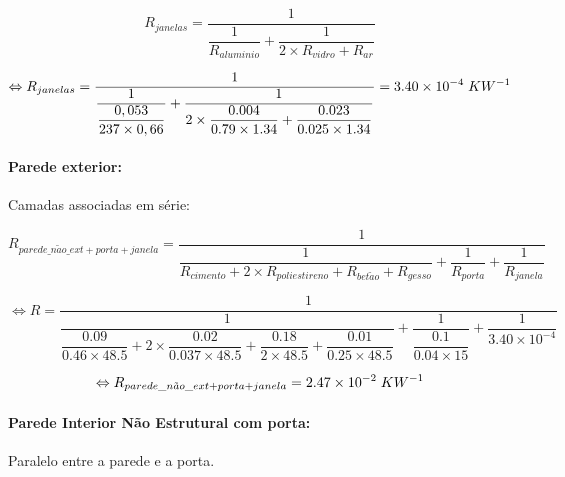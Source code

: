 \documentclass[12pt, a4paper]{article}
\begin{document}
\begin{equation}
	R_{janelas} = \dfrac{1}{\dfrac{1}{R_{aluminio}} + \dfrac{1}{2 \times R_{vidro} + R_{ar}}}
	\label{eq:zona_a_janelas}
\end{equation}

\begin{equation}
	\Leftrightarrow 
	R_{janelas} =
	\dfrac{1}{
		\dfrac{1}{
			\dfrac{0,053}{237 \times 0,66}
		}+
		\dfrac{1}{
			2 \times \dfrac{0.004}{0.79 \times 1.34} +
			\dfrac{0.023}{0.025 \times 1.34}
		}
	}
		= 3.40 \times 10^{-4} \hspace{1mm} KW^{-1}
	\label{eq:zona_a_janelas2}
\end{equation}


\paragraph{Parede exterior:}\label{par:zona_a_ext}Camadas associadas em série:

\begin{equation}
    R_{parede\_n\tilde{a}o\_ext + porta + janela} =
        \dfrac{1}{
			\dfrac{1}{
			R_{cimento} + 2 \times R_{poliestireno} + R_{bet\tilde{a}o} + R_{gesso}
			}  
			+
			\dfrac{1}{
				R_{porta}
			}  
			+
			\dfrac{1}{
				R_{janela}
			}  
		}
    \label{eq:zona_a_ext_1}
\end{equation}

\begin{equation}
    \Leftrightarrow R =
        \dfrac{1}{
			\dfrac{1}{
				\dfrac{0.09}{0.46 \times 48.5} +
				2 \times \dfrac{0.02}{0.037 \times 48.5} +
				\dfrac{0.18}{2 \times 48.5} +
				\dfrac{0.01}{0.25 \times 48.5} 
        	}
			+
			\dfrac{1}{
            	\dfrac{0.1}{0.04 \times 15}
			}
			+
			\dfrac{1}{
            	3.40 \times 10^{-4}
			}
		}
    \label{eq:zona_a_ext_2}
\end{equation}

\begin{equation}
	\Leftrightarrow R_{parede\_n\tilde{a}o\_ext + porta + janela} = 2.47 \times 10^{-2} \hspace{1mm} KW^{-1}
	\label{eq:zona_a_ext_3}
\end{equation}

\paragraph{Parede Interior N\~ao Estrutural com porta:}\label{par:zona_a_int_n_est}Paralelo entre a parede e a porta. 
\end{document}
